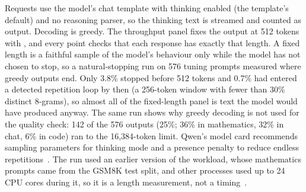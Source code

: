 Requests use the model's chat template with thinking enabled (the template's default) and no reasoning parser, so the thinking text is streamed and counted as output. Decoding is greedy. The throughput panel fixes the output at 512 tokens with , and every point checks that each response has exactly that length. A fixed length is a faithful sample of the model's behaviour only while the model has not chosen to stop, so a natural-stopping run on 576 tuning prompts measured where greedy outputs end. Only 3.8\% stopped before 512 tokens and 0.7\% had entered a detected repetition loop by then (a 256-token window with fewer than 30\% distinct 8-grams), so almost all of the fixed-length panel is text the model would have produced anyway. The same run shows why greedy decoding is not used for the quality check: 142 of the 576 outputs (25\%; 36\% in mathematics, 32\% in chat, 6\% in code) ran to the 16,384-token limit. Qwen's model card recommends sampling parameters for thinking mode and a presence penalty to reduce endless repetitions~\cite{qwencard}. The run used an earlier version of the workload, whose mathematics prompts came from the GSM8K test split, and other processes used up to 24 CPU cores during it, so it is a length measurement, not a timing~.

